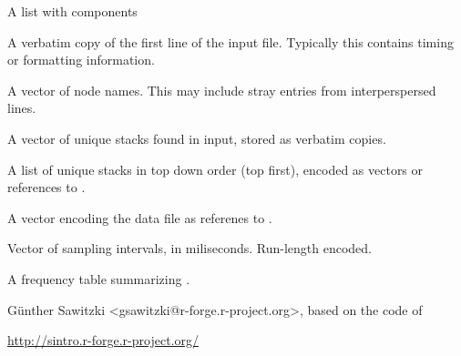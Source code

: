 \documentclass[a4paper]{book}
\begin{document}
\begin{Value}
A list with components
\begin{ldescription}
\item[\code{firstline}] A verbatim copy of the first line of the input file. 
Typically this contains timing or formatting information.
\item[\code{nodes}] A vector of node names. 
This may include stray entries from interperspersed lines.
\item[\code{stacks}] A vector of unique stacks found in input, stored as verbatim copies.
\item[\code{stacksrenc}] A list of unique stacks in top down order (top first), 
encoded as vectors or references to .
\item[\code{data}] A vector encoding the data file as referenes to  .
\item[\code{timesRLE}] Vector of sampling intervals, in miliseconds. Run-length encoded.
\item[\code{freq}] A frequency table summarizing .

\end{ldescription}
\end{Value}
%
\begin{Author}\relax
Günther Sawitzki <gsawitzki@r-forge.r-project.org>, based on the code of 
\end{Author}
%
\begin{References}\relax
  \url{http://sintro.r-forge.r-project.org/} 
\end{References}
%
\end{document}
